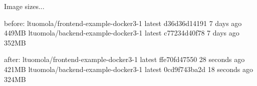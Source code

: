 Image sizes...

before:
ltuomola/frontend-example-docker3-1        latest              d36d36d14191        7 days ago          449MB
ltuomola/backend-example-docker3-1         latest              c77234d40f78        7 days ago          352MB

after:
ltuomola/frontend-example-docker3-1        latest              ffe70fd47550        28 seconds ago      421MB
ltuomola/backend-example-docker3-1         latest              0cd9f743ba2d        18 seconds ago      324MB



